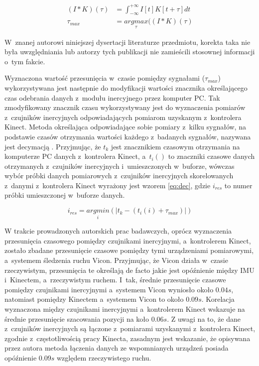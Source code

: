 \begin{subequations}
	\begin{align}
		(I \ast K)(\tau) & = \int_{-\infty}^{+\infty}I[t]K[t+\tau]dt\label{eq:cross-cor:1}  \\
		\tau_{max}       & = \underset{\tau}{argmax}((I \ast K)(\tau)\label{eq:cross-cor:2} 
	\end{align}
	\label{eq:cross-cor}
\end{subequations}
										
W~znanej autorowi niniejszej dysertacji literaturze przedmiotu, korekta taka nie była uwzględniania lub autorzy tych publikacji nie zamieścili stosownej informacji o~tym fakcie.

Wyznaczona wartość przesunięcia w~czasie pomiędzy sygnałami ($\tau_{max}$) wykorzystywana jest następnie do modyfikacji wartości znacznika określającego czas odebrania danych z~modułu inercyjnego przez komputer PC. Tak zmodyfikowany znacznik czasu wykorzystywany jest do wyznaczenia pomiarów z~czujników inercyjnych odpowiadających pomiarom uzyskanym z~kontrolera Kinect. Metoda określająca odpowiadające sobie pomiary z~kilku sygnałów, na podstawie czasów otrzymania wartości każdego z~badanych sygnałów, nazywana jest decymacją \cite{Hinton2001}. Przyjmując, że $t_k$ jest znacznikiem czasowym otrzymania na komputerze PC danych z~kontrolera Kinect, a~$t_i()$ to znaczniki czasowe danych  otrzymanych z~czujników inercyjnych i~umieszczonych w~buforze, wówczas wybór próbki danych pomiarowych z~czujników inercyjnych skorelowanych z~danymi z~kontrolera Kinect wyrażony jest wzorem \ref{eq:dec}, gdzie $i_{res}$ to numer próbki umieszczonej w~buforze danych.
										
\begin{equation}
	i_{res} = \underset{i}{argmin}(|t_k-(t_i(i) + \tau_{max})|)
	\label{eq:dec}
\end{equation}
										
W trakcie prowadzonych autorskich prac badawczych, oprócz wyznaczenia przesunięcia czasowego pomiędzy czujnikami inercyjnymi, a~kontrolerem Kinect, zostało zbadane przesunięcie czasowe pomiędzy tymi urządzeniami pomiarowymi, a~systemem śledzenia ruchu Vicon. Przyjmując, że Vicon działa w~czasie rzeczywistym, przesunięcia te określają de facto jakie jest opóźnienie między IMU i~Kinectem, a~rzeczywistym ruchem. I~tak, średnie przesunięcie czasowe pomiędzy czujnikami inercyjnymi a~systemem Vicon wyniosło około $0.04s$, natomiast pomiędzy Kinectem a~systemem Vicon to około $0.09s$. Korelacja wyznaczona między czujnikami inercyjnymi a~kontrolerem Kinect wskazuje na średnie przesunięcie szacowania pozycji na koło $0.06s$. Z uwagi na to, że dane z~czujników inercyjnych są łączone z~pomiarami uzyskanymi z~kontrolera Kinect, zgodnie z~częstotliwością pracy Kinecta, zasadnym jest wskazanie, że opisywana przez autora metoda łączenia danych ze wspomnianych urządzeń posiada opóźnienie $0.09s$ względem rzeczywistego ruchu.
										
